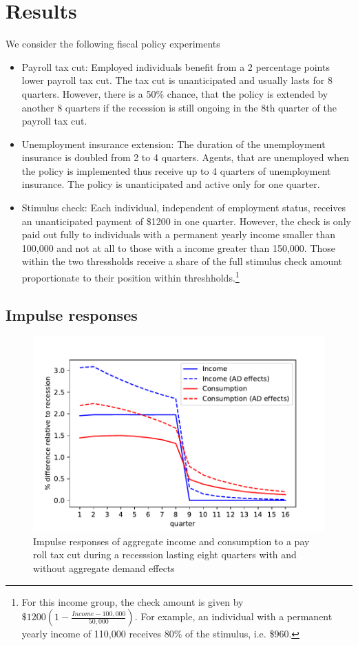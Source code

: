 \documentclass[../HAFiscal]{subfiles}
\begin{document}
\section{Results}

We consider the following fiscal policy experiments

\begin{itemize}
	\item Payroll tax cut: Employed individuals benefit from a 2 percentage points lower payroll tax cut. The tax cut is unanticipated and usually lasts for 8 quarters. However, there is a 50\% chance, that the policy is extended by another 8 quarters if the recession is still ongoing in the 8th quarter of the payroll tax cut. 
	\item Unemployment insurance extension: The duration of the unemployment insurance is doubled from 2 to 4 quarters. Agents, that are unemployed when the policy is implemented thus receive up to 4 quarters of unemployment insurance. The policy is unanticipated and active only for one quarter.
	\item Stimulus check: Each individual, independent of employment status, receives an unanticipated payment of \$1200 in one quarter. However, the check is only paid out fully to individuals with a permanent yearly income smaller than 100,000 and not at all to those with a income greater than 150,000. Those within the two thressholds receive a share of the full stimulus check amount proportionate to their position within threshholds.\footnote{For this income group, the check amount is given by $\$1200 (1-\frac{Income-100,000}{50,000})$. For example, an individual with a permanent yearly income of 110,000 receives 80\% of the stimulus, i.e. \$960.}
\end{itemize}

\subsection{Impulse responses}


\begin{figure}
	\centering
	\includegraphics[width=0.8\linewidth]{Code/HA-Models/FromPandemicCode/Figures/recession_taxcut_relrecession}
	\caption{Impulse responses of aggregate income and consumption to a pay roll tax cut during a recesssion lasting eight quarters with and without aggregate demand effects}
	\label{fig:recessiontaxcutrelrecession}
\end{figure}
\end{document}
